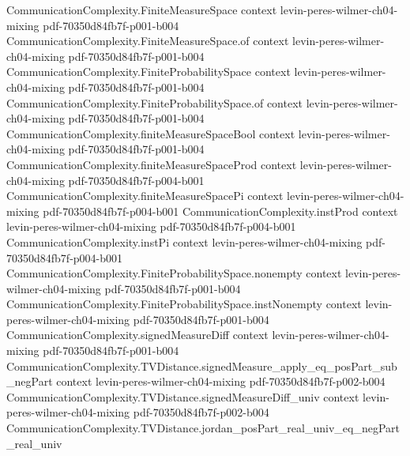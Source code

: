 \begin{lemma}
\label{CommunicationComplexity.TVDistance.event_abs_measureReal_sub_le_half_totalVariation}
\leanok
{}
\proofstep
  {CommunicationComplexity.FiniteMeasureSpace}
  {context}
  {levin-peres-wilmer-ch04-mixing}
  {pdf-70350d84fb7f-p001-b004}
\proofstep
  {CommunicationComplexity.FiniteMeasureSpace.of}
  {context}
  {levin-peres-wilmer-ch04-mixing}
  {pdf-70350d84fb7f-p001-b004}
\proofstep
  {CommunicationComplexity.FiniteProbabilitySpace}
  {context}
  {levin-peres-wilmer-ch04-mixing}
  {pdf-70350d84fb7f-p001-b004}
\proofstep
  {CommunicationComplexity.FiniteProbabilitySpace.of}
  {context}
  {levin-peres-wilmer-ch04-mixing}
  {pdf-70350d84fb7f-p001-b004}
\proofstep
  {CommunicationComplexity.finiteMeasureSpaceBool}
  {context}
  {levin-peres-wilmer-ch04-mixing}
  {pdf-70350d84fb7f-p001-b004}
\proofstep
  {CommunicationComplexity.finiteMeasureSpaceProd}
  {context}
  {levin-peres-wilmer-ch04-mixing}
  {pdf-70350d84fb7f-p004-b001}
\proofstep
  {CommunicationComplexity.finiteMeasureSpacePi}
  {context}
  {levin-peres-wilmer-ch04-mixing}
  {pdf-70350d84fb7f-p004-b001}
\proofstep
  {CommunicationComplexity.instProd}
  {context}
  {levin-peres-wilmer-ch04-mixing}
  {pdf-70350d84fb7f-p004-b001}
\proofstep
  {CommunicationComplexity.instPi}
  {context}
  {levin-peres-wilmer-ch04-mixing}
  {pdf-70350d84fb7f-p004-b001}
\proofstep
  {CommunicationComplexity.FiniteProbabilitySpace.nonempty}
  {context}
  {levin-peres-wilmer-ch04-mixing}
  {pdf-70350d84fb7f-p001-b004}
\proofstep
  {CommunicationComplexity.FiniteProbabilitySpace.instNonempty}
  {context}
  {levin-peres-wilmer-ch04-mixing}
  {pdf-70350d84fb7f-p001-b004}
\proofstep
  {CommunicationComplexity.signedMeasureDiff}
  {context}
  {levin-peres-wilmer-ch04-mixing}
  {pdf-70350d84fb7f-p001-b004}
\proofstep
  {CommunicationComplexity.TVDistance.signedMeasure_apply_eq_posPart_sub_negPart}
  {context}
  {levin-peres-wilmer-ch04-mixing}
  {pdf-70350d84fb7f-p002-b004}
\proofstep
  {CommunicationComplexity.TVDistance.signedMeasureDiff_univ}
  {context}
  {levin-peres-wilmer-ch04-mixing}
  {pdf-70350d84fb7f-p002-b004}
\proofstep
  {CommunicationComplexity.TVDistance.jordan_posPart_real_univ_eq_negPart_real_univ}

\end{lemma}
